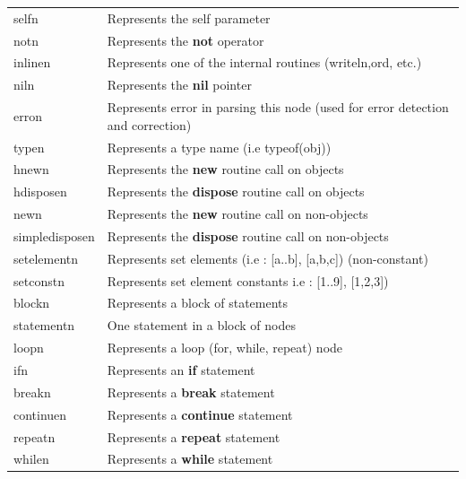 \documentclass [a4paper,12pt]{article}
\begin{document}
\begin{longtable}{|l|p{10cm}|}
\textsf{selfn}&
        \textsf{Represents the self parameter} \\
\textsf{notn}&
        \textsf{Represents the }\textsf{\textbf{not}}\textsf{ operator} \\
\textsf{inlinen}&
        \textsf{Represents one of the internal routines (writeln,ord, etc.)} \\
\textsf{niln}&
        \textsf{Represents the }\textsf{\textbf{nil}}\textsf{ pointer } \\
\textsf{erron}&
        \textsf{Represents error in parsing this node (used for error detection and correction)} \\
\textsf{typen}&
        \textsf{Represents a type name (i.e typeof(obj))} \\
\textsf{hnewn}&
        \textsf{Represents the }\textsf{\textbf{new }}\textsf{routine call on objects} \\
\textsf{hdisposen}&
        \textsf{Represents the }\textsf{\textbf{dispose}}\textsf{ routine call on objects} \\
\textsf{newn}&
        \textsf{Represents the }\textsf{\textbf{new}}\textsf{ routine call on non-objects} \\
\textsf{simpledisposen}&
        \textsf{Represents the }\textsf{\textbf{dispose}}\textsf{ routine call on non-objects} \\
\textsf{setelementn}&
        \textsf{Represents set elements (i.e : [a..b], [a,b,c]) (non-constant)} \\
\textsf{setconstn}&
        \textsf{Represents set element constants i.e : [1..9], [1,2,3])} \\
\textsf{blockn}&
        \textsf{Represents a block of statements} \\
\textsf{statementn}&
        \textsf{One statement in a block of nodes} \\
\textsf{loopn}&
        \textsf{Represents a loop (for, while, repeat) node} \\
\textsf{ifn}&
        \textsf{Represents an }\textsf{\textbf{if}}\textsf{ statement} \\
\textsf{breakn}&
        \textsf{Represents a }\textsf{\textbf{break}}\textsf{ statement} \\
\textsf{continuen}&
        \textsf{Represents a }\textsf{\textbf{continue}}\textsf{ statement} \\
\textsf{repeatn}&
        \textsf{Represents a }\textsf{\textbf{repeat }}\textsf{statement} \\
\textsf{whilen}&
        \textsf{Represents a }\textsf{\textbf{while}}\textsf{ statement} \\

\end{longtable}
\end{document}
